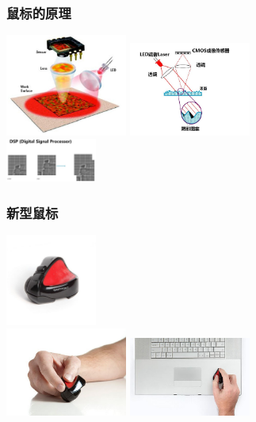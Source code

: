 \documentclass{beamer}
\begin{document}
\begin{frame}
	\frametitle{鼠标的原理}
	\transdissolve
	\begin{center}
	\includegraphics[width=4cm]{images/mouse-basics-1.jpg}
	\includegraphics[width=4cm]{images/mouse-basics-2.jpg}\\
	\pause
	\includegraphics[width=3cm]{images/mouse-basics-3.jpg}
	\end{center}
\end{frame}

\begin{frame}
	\frametitle{新型鼠标}
	\transdissolve
	\begin{center}
	\includegraphics[width=3cm]{images/swiftpoint-mouse1.jpg}\\
	\pause
	\includegraphics[width=4cm]{images/swiftpoint-mouse3.jpg}
	\includegraphics[width=4cm]{images/swiftpoint-mouse6.jpg}
	\end{center}
\end{frame}
\end{document}
